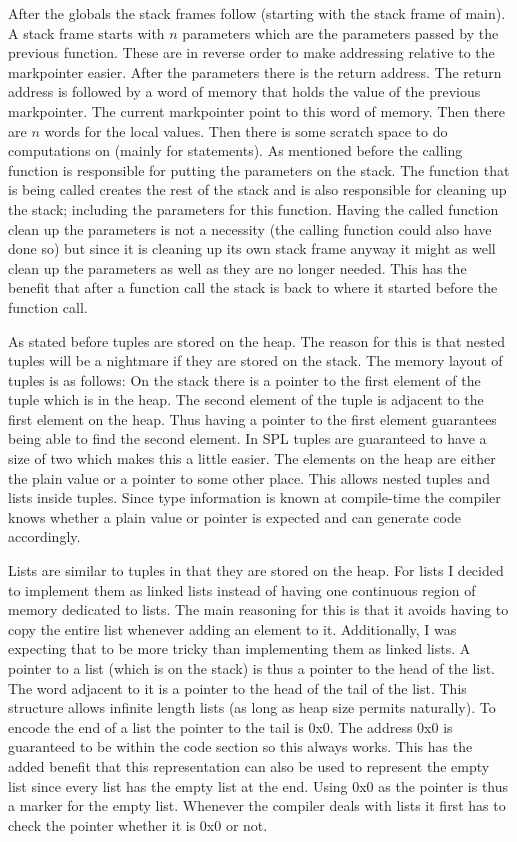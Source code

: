 \documentclass{article}
\begin{document}
After the globals the stack frames follow (starting with the stack frame of main). A stack frame starts with $n$ parameters which are the parameters passed by the previous function. These are in reverse order to make addressing relative to the markpointer easier. After the parameters there is the return address. The return address is followed by a word of memory that holds the value of the previous markpointer. The current markpointer point to this word of memory. Then there are $n$ words for the local values. Then there is some scratch space to do computations on (mainly for statements). As mentioned before the calling function is responsible for putting the parameters on the stack. The function that is being called creates the rest of the stack and is also responsible for cleaning up the stack; including the parameters for this function. Having the called function clean up the parameters is not a necessity (the calling function could also have done so) but since it is cleaning up its own stack frame anyway it might as well clean up the parameters as well as they are no longer needed. This has the benefit that after a function call the stack is back to where it started before the function call.

As stated before tuples are stored on the heap. The reason for this is that nested tuples will be a nightmare if they are stored on the stack. The memory layout of tuples is as follows: On the stack there is a pointer to the first element of the tuple which is in the heap. The second element of the tuple is adjacent to the first element on the heap. Thus having a pointer to the first element guarantees being able to find the second element. In SPL tuples are guaranteed to have a size of two which makes this a little easier. The elements on the heap are either the plain value or a pointer to some other place. This allows nested tuples and lists inside tuples. Since type information is known at compile-time the compiler knows whether a plain value or pointer is expected and can generate code accordingly.

Lists are similar to tuples in that they are stored on the heap. For lists I decided to implement them as linked lists instead of having one continuous region of memory dedicated to lists. The main reasoning for this is that it avoids having to copy the entire list whenever adding an element to it. Additionally, I was expecting that to be more tricky than implementing them as linked lists. A pointer to a list (which is on the stack) is thus a pointer to the head of the list. The word adjacent to it is a pointer to the head of the tail of the list. This structure allows infinite length lists (as long as heap size permits naturally). To encode the end of a list the pointer to the tail is 0x0. The address 0x0 is guaranteed to be within the code section so this always works. This has the added benefit that this representation can also be used to represent the empty list since every list has the empty list at the end. Using 0x0 as the pointer is thus a marker for the empty list. Whenever the compiler deals with lists it first has to check the pointer whether it is 0x0 or not.
\end{document}
